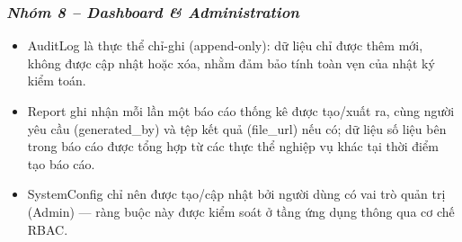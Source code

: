 \hypertarget{nhuxf3m-8-dashboard-administration}{%
\subsubsection{\texorpdfstring{\emph{\textbf{Nhóm 8 -- Dashboard \& Administration}}}{Nhóm 8 -- Dashboard \& Administration}}\label{nhuxf3m-8-dashboard-administration}}

\begin{itemize}
\item
  AuditLog là thực thể chỉ-ghi (append-only): dữ liệu chỉ được thêm mới, không được cập nhật hoặc xóa, nhằm đảm bảo tính toàn vẹn của nhật ký kiểm toán.
\item
  Report ghi nhận mỗi lần một báo cáo thống kê được tạo/xuất ra, cùng người yêu cầu (generated\_by) và tệp kết quả (file\_url) nếu có; dữ liệu số liệu bên trong báo cáo được tổng hợp từ các thực thể nghiệp vụ khác tại thời điểm tạo báo cáo.
\item
  SystemConfig chỉ nên được tạo/cập nhật bởi người dùng có vai trò quản trị (Admin) --- ràng buộc này được kiểm soát ở tầng ứng dụng thông qua cơ chế RBAC.
\end{itemize}
%
%
